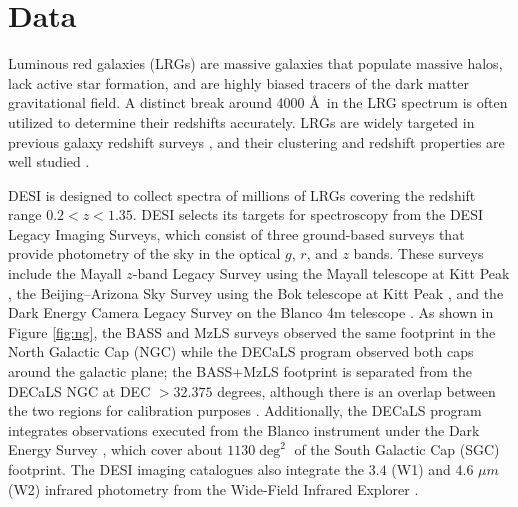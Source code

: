 \section{Data}
\label{sec:data}

Luminous red galaxies (LRGs) are massive galaxies that populate massive halos, lack active star formation, and are highly biased tracers of the dark matter gravitational field. A distinct break around 4000 \AA~in the LRG spectrum is often utilized to determine their redshifts accurately. LRGs are widely targeted in previous galaxy redshift surveys \citep[see, e.g.,][]{eisenstein2001spectroscopic, prakash2016sdss}, and their clustering and redshift properties are well studied \citep[see, e.g.,][]{ross2020MNRAS.498.2354R, gilmarin2020MNRAS.498.2492G, bautista2021MNRAS.500..736B, chapman2022MNRAS.516..617C}. 

DESI is designed to collect spectra of millions of LRGs covering the redshift range $0.2<z<1.35$. DESI selects its targets for spectroscopy from the DESI Legacy Imaging Surveys, which consist of three ground-based surveys that provide photometry of the sky in the optical $g$, $r$, and $z$ bands. These surveys include the Mayall $z$-band Legacy Survey using the Mayall telescope at Kitt Peak \citep[MzLS;][]{dey2018overview}, the Beijing–Arizona Sky Survey using the Bok telescope at Kitt Peak \citep[BASS;][]{zou2017project}, and the Dark Energy Camera Legacy Survey on the Blanco 4m telescope \citep[DECaLS;][]{flaugher2015dark}. As shown in Figure \ref{fig:ng}, the BASS and MzLS surveys observed the same footprint in the North Galactic Cap (NGC) while the DECaLS program observed both caps around the galactic plane; the BASS+MzLS footprint is separated from the DECaLS NGC at DEC $> 32.375$ degrees, although there is an overlap between the two regions for calibration purposes \citep{dey2018overview}. Additionally, the DECaLS program integrates observations executed from the Blanco instrument under the Dark Energy Survey \citep{abbott2016dark}, which cover about $1130 \deg^{2}$ of the South Galactic Cap (SGC) footprint. The DESI imaging catalogues also integrate the $3.4$ (W1) and $4.6$ $\mu m$ (W2) infrared photometry from the Wide-Field Infrared Explorer \citep[WISE;][]{wise2010AJ....140.1868W, meisner2018RNAAS...2....1M}.  


